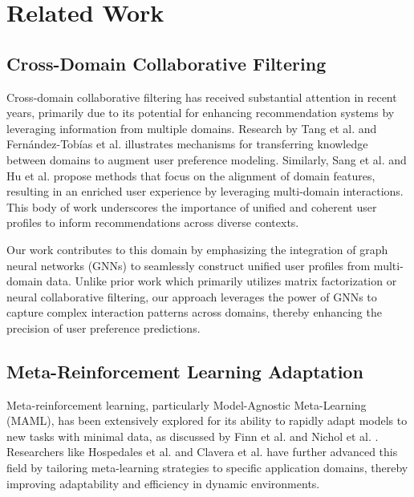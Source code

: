 \section{Related Work}

\subsection{Cross-Domain Collaborative Filtering}

Cross-domain collaborative filtering has received substantial attention in recent years, primarily due to its potential for enhancing recommendation systems by leveraging information from multiple domains. Research by Tang et al. \cite{tang2012cross} and Fernández-Tobías et al. \cite{fernandez2012cross} illustrates mechanisms for transferring knowledge between domains to augment user preference modeling. Similarly, Sang et al. \cite{sang2015effective} and Hu et al. \cite{hu2018conet} propose methods that focus on the alignment of domain features, resulting in an enriched user experience by leveraging multi-domain interactions. This body of work underscores the importance of unified and coherent user profiles to inform recommendations across diverse contexts.

Our work contributes to this domain by emphasizing the integration of graph neural networks (GNNs) to seamlessly construct unified user profiles from multi-domain data. Unlike prior work which primarily utilizes matrix factorization or neural collaborative filtering, our approach leverages the power of GNNs to capture complex interaction patterns across domains, thereby enhancing the precision of user preference predictions.

\subsection{Meta-Reinforcement Learning Adaptation}

Meta-reinforcement learning, particularly Model-Agnostic Meta-Learning (MAML), has been extensively explored for its ability to rapidly adapt models to new tasks with minimal data, as discussed by Finn et al. \cite{finn2017model} and Nichol et al. \cite{nichol2018first}. Researchers like Hospedales et al. \cite{hospedales2021meta} and Clavera et al. \cite{clavera2018learning} have further advanced this field by tailoring meta-learning strategies to specific application domains, thereby improving adaptability and efficiency in dynamic environments.


